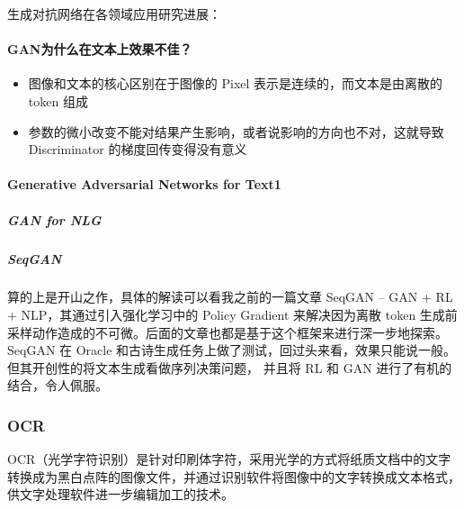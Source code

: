 \documentclass[letterpaper,10pt,english]{sphinxmanual}
\begin{document}
生成对抗网络在各领域应用研究进展：


\paragraph{GAN为什么在文本上效果不佳？}
\label{\detokenize{chapter_AI_dive/GAN:id1}}\begin{itemize}
\item {} 
图像和文本的核心区别在于图像的 Pixel 表示是连续的，而文本是由离散的
token 组成

\item {} 
参数的微小改变不能对结果产生影响，或者说影响的方向也不对，这就导致
Discriminator 的梯度回传变得没有意义

\end{itemize}


\paragraph{Generative Adversarial Networks for Text1\sphinxfootnotemark[951]}
\label{\detokenize{chapter_AI_dive/GAN:generative-adversarial-networks-for-text1}}%
\begin{footnotetext}[951]\sphinxAtStartFootnote
{}
%
\end{footnotetext}\ignorespaces 

\subparagraph{GAN for NLG}
\label{\detokenize{chapter_AI_dive/GAN:gan-for-nlg}}

\subparagraph{SeqGAN}
\label{\detokenize{chapter_AI_dive/GAN:seqgan}}
算的上是开山之作，具体的解读可以看我之前的一篇文章 SeqGAN – GAN + RL +
NLP，其通过引入强化学习中的 Policy Gradient 来解决因为离散 token
生成前采样动作造成的不可微。后面的文章也都是基于这个框架来进行深一步地探索。SeqGAN
在 Oracle
和古诗生成任务上做了测试，回过头来看，效果只能说一般。但其开创性的将文本生成看做序列决策问题，
并且将 RL 和 GAN
进行了有机的结合，令人佩服。%
\begin{footnote}[952]\sphinxAtStartFootnote
{}
%
\end{footnote}


\subsubsection{OCR}
\label{\detokenize{chapter_AI_dive/OCR:ocr}}\label{\detokenize{chapter_AI_dive/OCR::doc}}
OCR（光学字符识别）是针对印刷体字符，采用光学的方式将纸质文档中的文字转换成为黑白点阵的图像文件，并通过识别软件将图像中的文字转换成文本格式，供文字处理软件进一步编辑加工的技术。%
\begin{footnote}[953]\sphinxAtStartFootnote
{}
%
\end{footnote}
\end{document}
